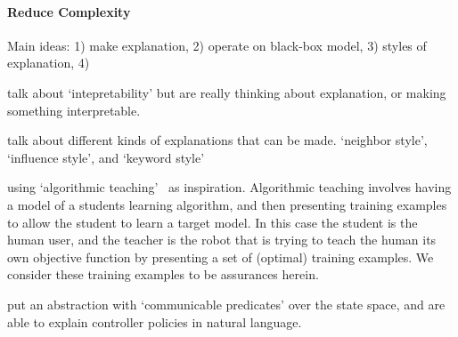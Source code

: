 \paragraph{Reduce Complexity} \label{sec:reduce_complexity}
Main ideas: 1) make explanation, 2) operate on black-box model, 3) styles of explanation, 4) 

\citet{Olah2018-rp} talk about `intepretability' but are really thinking about explanation, or making something interpretable.

\citet{Abdollahi2018-uw} talk about different kinds of explanations that can be made. `neighbor style', `influence style', and `keyword style'

\citet{Huang2017-lk} using `algorithmic teaching'~\cite{Balbach2009-jw} as inspiration. Algorithmic teaching involves having a model of a students learning algorithm, and then presenting training examples to allow the student to learn a target model. In this case the student is the human user, and the teacher is the robot that is trying to teach the human its own objective function by presenting a set of (optimal) training examples. We consider these training examples to be assurances herein.

\citet{Hayes2017-nt} put an abstraction with `communicable predicates' over the state space, and are able to explain controller policies in natural language.

